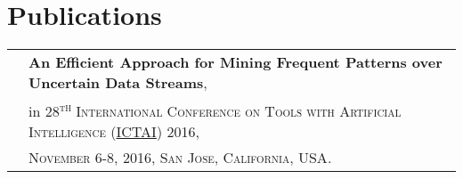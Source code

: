 \documentclass[a4paper,10pt]{article}
\begin{document}
%
%
%
%
%
%
%
\section*{Publications}

\begin{tabular}{r|l}
							&\textbf{An Efficient Approach for Mining Frequent Patterns over Uncertain Data Streams},\\
							&in \textsc{28\textsuperscript{th} International Conference on Tools with Artificial Intelligence (\href{http://www.ictai2016.com/}{ICTAI}) 2016},\\
							&\textsc{November 6-8, 2016, San Jose, California, USA}.\\
\end{tabular}
\end{document}
